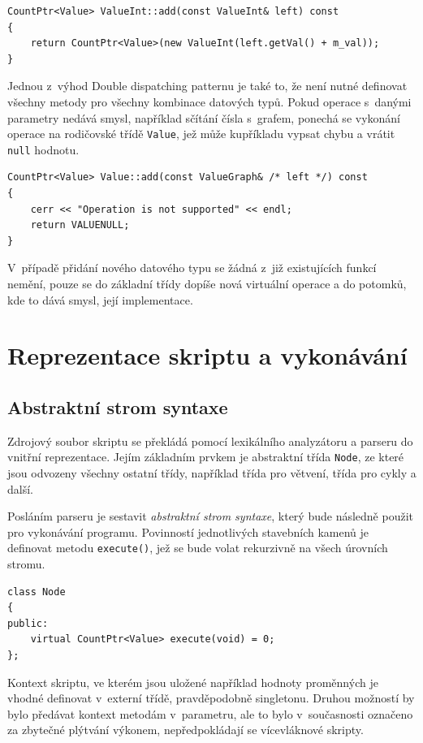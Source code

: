 \documentclass[11pt,twoside,a4paper]{book}
\begin{document}
\begin{verbatim}
CountPtr<Value> ValueInt::add(const ValueInt& left) const
{
    return CountPtr<Value>(new ValueInt(left.getVal() + m_val));
}
\end{verbatim}

Jednou z~výhod Double dispatching patternu je také to, že není nutné definovat všechny metody pro všechny kombinace datových typů. Pokud operace s~danými parametry nedává smysl, například sčítání čísla s~grafem, ponechá se vykonání operace na rodičovské třídě \texttt{Value}, jež může kupříkladu vypsat chybu a vrátit \texttt{null} hodnotu.

\begin{verbatim}
CountPtr<Value> Value::add(const ValueGraph& /* left */) const
{
    cerr << "Operation is not supported" << endl;
    return VALUENULL;
}
\end{verbatim}

V~případě přidání nového datového typu se žádná z~již existujících funkcí nemění, pouze se do základní třídy dopíše nová virtuální operace a do potomků, kde to dává smysl, její implementace.


\section{Reprezentace skriptu a vykonávání}

\subsection{Abstraktní strom syntaxe}
\label{abstraktni_strom_syntaxe}

Zdrojový soubor skriptu se překládá pomocí lexikálního analyzátoru a parseru do vnitřní reprezentace. Jejím základním prvkem je abstraktní třída \texttt{Node}, ze které jsou odvozeny všechny ostatní třídy, například třída pro větvení, třída pro cykly a další.

Posláním parseru je sestavit \textit{abstraktní strom syntaxe}, který bude následně použit pro vykonávání programu. Povinností jednotlivých stavebních kamenů je definovat metodu \texttt{e\-xe\-cu\-te()}, jež se bude volat rekurzivně na všech úrovních stromu.

\begin{verbatim}
class Node
{
public:
    virtual CountPtr<Value> execute(void) = 0;
};
\end{verbatim}

Kontext skriptu, ve kterém jsou uložené například hodnoty proměnných je vhodné definovat v~externí třídě, pravděpodobně singletonu. Druhou možností by bylo předávat kontext metodám v~parametru, ale to bylo v~současnosti označeno za zbytečné plýtvání výkonem, nepředpokládají se vícevláknové skripty.
\end{document}
